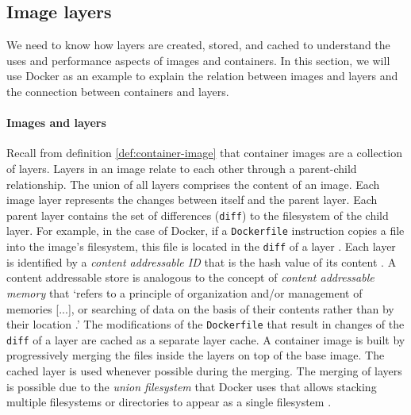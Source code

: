 \subsection{Image layers}\label{layers}
We need to know how layers are created, stored, and cached to understand the uses and performance aspects of images and containers. In this section, we will use Docker as an example to explain the relation between images and layers and the connection between containers and layers.

\paragraph{Images and layers}\label{images-and-layers}
Recall from definition \ref{def:container-image} that container images are a collection of layers. Layers in an image relate to each other through a parent-child relationship. The union of all layers comprises the content of an image. Each image layer represents the changes between itself and the parent layer. Each parent layer contains the set of differences (\verb|diff|) to the filesystem of the child layer. %
For example, in the case of Docker, if a \verb|Dockerfile| instruction copies a file into the image's filesystem, this file is located in the \verb|diff| of a layer \cite{DockerStorageDrivers}\cite{BraunDockerLayers}. Each layer is identified by a \emph{content addressable ID} that is the hash value of its content \cite{BraunDockerLayers}. A content addressable store is analogous to the concept of \emph{content addressable memory} that `refers to a principle of organization and/or management of memories [...], or searching of data on the basis of their contents rather than by their location \cite[p.~1]{Kohonen1980}.' The modifications of the \verb|Dockerfile| that result in changes of the \verb|diff| of a layer are cached as a separate layer cache. A container image is built by progressively merging the files inside the layers on top of the base image. The cached layer is used whenever possible during the merging. The merging of layers is possible due to the \emph{union filesystem} that Docker uses that allows stacking multiple filesystems or directories to appear as a single filesystem \cite{DockerStorageDrivers}\cite{Wright2004}.

